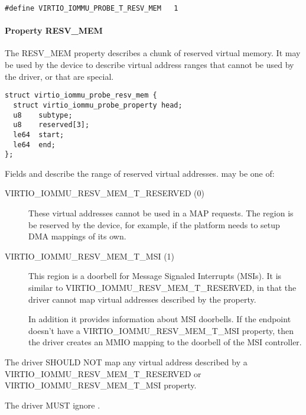 \begin{lstlisting}
#define VIRTIO_IOMMU_PROBE_T_RESV_MEM   1
\end{lstlisting}

\paragraph{Property RESV_MEM}\label{sec:Device Types / IOMMU Device / Device operations / PROBE properties / RESVMEM}

The RESV_MEM property describes a chunk of reserved virtual memory. It may
be used by the device to describe virtual address ranges that cannot be
used by the driver, or that are special.

\begin{lstlisting}
struct virtio_iommu_probe_resv_mem {
  struct virtio_iommu_probe_property head;
  u8    subtype;
  u8    reserved[3];
  le64  start;
  le64  end;
};
\end{lstlisting}

Fields  and  describe the range of reserved virtual
addresses.  may be one of:

\begin{description}
  \item[VIRTIO_IOMMU_RESV_MEM_T_RESERVED (0)]
    These virtual addresses cannot be used in a MAP requests. The region
    is be reserved by the device, for example, if the platform needs to
    setup DMA mappings of its own.

  \item[VIRTIO_IOMMU_RESV_MEM_T_MSI (1)]
    This region is a doorbell for Message Signaled Interrupts (MSIs). It
    is similar to VIRTIO_IOMMU_RESV_MEM_T_RESERVED, in that the driver
    cannot map virtual addresses described by the property.

    In addition it provides information about MSI doorbells. If the
    endpoint doesn't have a VIRTIO_IOMMU_RESV_MEM_T_MSI property, then the
    driver creates an MMIO mapping to the doorbell of the MSI controller.
\end{description}


The driver SHOULD NOT map any virtual address described by a
VIRTIO_IOMMU_RESV_MEM_T_RESERVED or VIRTIO_IOMMU_RESV_MEM_T_MSI property.

The driver MUST ignore .

